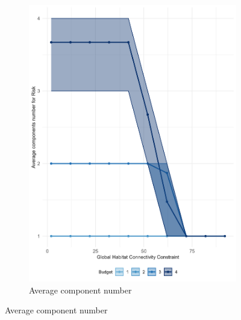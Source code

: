 \begin{figure}
\begin{subfigure}[b]{.48\textwidth}
        \includegraphics[height = .4\textheight]{figures/wildland/average_components_number.jpg}
        \caption{Average component number}
        \label{fig:component_number}
    \end{subfigure}
    
    \vspace{1em} %


\end{figure}
